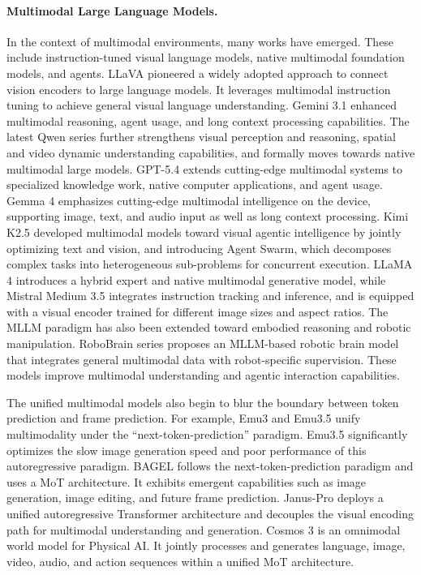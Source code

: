 \documentclass{llmxive}
\begin{document}
\paragraph{Multimodal Large Language Models.}\label{sec:mllms}
In the context of multimodal environments, many works have emerged. These include instruction-tuned visual language models, native multimodal foundation models, and agents.
LLaVA \citep{llava} pioneered a widely adopted approach to connect vision encoders to large language models. It leverages multimodal instruction tuning to achieve general visual language understanding. Gemini 3.1 \citep{Gemini-3.1-pro} enhanced multimodal reasoning, agent usage, and long context processing capabilities. The latest Qwen series \citep{Qwen3VL, qwen36_35b_a3b} further strengthens visual perception and reasoning, spatial and video dynamic understanding capabilities, and formally moves towards native multimodal large models. GPT-5.4 \citep{GPT54} extends cutting-edge multimodal systems to specialized knowledge work, native computer applications, and agent usage. Gemma 4 \citep{Gemma4} emphasizes cutting-edge multimodal intelligence on the device, supporting image, text, and audio input as well as long context processing. Kimi K2.5 \citep{KimiK2.5} developed multimodal models toward visual agentic intelligence by jointly optimizing text and vision, and introducing Agent Swarm, which decomposes complex tasks into heterogeneous sub-problems for concurrent execution. LLaMA 4 \citep{llama4} introduces a hybrid expert and native multimodal generative model, while Mistral Medium 3.5 \citep{Mistral-Medium-3.5} integrates instruction tracking and inference, and is equipped with a visual encoder trained for different image sizes and aspect ratios. The MLLM paradigm has also been extended toward embodied reasoning and robotic manipulation. RoboBrain series \citep{RoboBrain, RoboBrain2.0,reasonrft} proposes an MLLM-based robotic brain model that integrates general multimodal data with robot-specific supervision. These models improve multimodal understanding and agentic interaction capabilities.

The unified multimodal models also begin to blur the boundary between token prediction and frame prediction. For example, Emu3 \citep{Emu3} and Emu3.5 \citep{Emu35} unify multimodality under the ``next-token-prediction'' paradigm. Emu3.5 significantly optimizes the slow image generation speed and poor performance of this autoregressive paradigm. BAGEL \citep{BAGEL} follows the next-token-prediction paradigm and uses a MoT \citep{MoT} architecture. It exhibits emergent capabilities such as image generation, image editing, and future frame prediction. Janus-Pro \citep{Janus-Pro} deploys a unified autoregressive Transformer architecture and decouples the visual encoding path for multimodal understanding and generation. Cosmos 3 \citep{Cosmos3} is an omnimodal world model for Physical AI. It jointly processes and generates language, image, video, audio, and action sequences within a unified MoT architecture.
\end{document}
